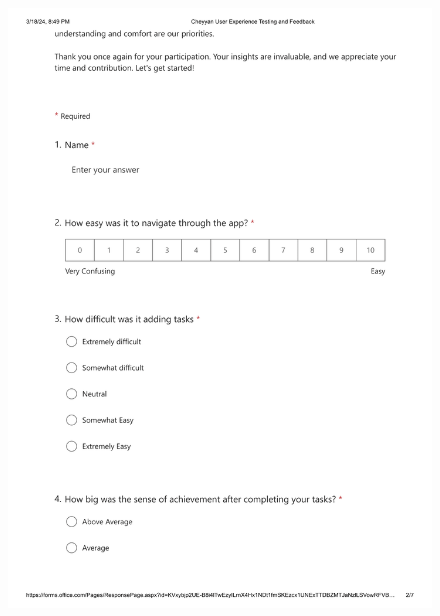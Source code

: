 \documentclass{l4proj}
\begin{document}
\begin{appendices}
\begin{figure}[h]
    \centering
    \includegraphics[height=20cm]{images/Cheyyan User Experience Testing and Feedback-2.png}
\end{figure}


\end{appendices}
\end{document}
